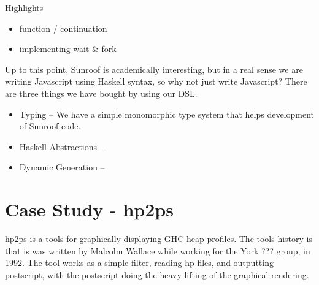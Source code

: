 \documentclass{llncs}
\begin{document}
Highlights
\begin{itemize}
\item function / continuation
\item implementing wait \& fork
\end{itemize}

Up to this point, Sunroof is academically interesting, but in a real sense
we are writing Javascript using Haskell syntax, so why not just write
Javascript? There are three things we have bought by using our DSL.
\begin{itemize}
\item Typing -- We have a simple monomorphic type system that helps development of Sunroof code.
\item Haskell Abstractions --
\item Dynamic Generation -- 
\end{itemize}

\section{Case Study - hp2ps}

hp2ps is a tools for graphically displaying GHC heap profiles.
The tools history is that is was written by Malcolm Wallace while working
for the York ??? group, in 1992. The tool works as a simple filter,
reading hp files, and outputting postscript, with the postscript
doing the heavy lifting of the graphical rendering.







%
%




\end{document}
